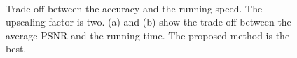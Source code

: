 \documentclass[review,numbers,sort&compress]{elsarticle}  %
\begin{document}
\begin{figure}[htbp]
\centering
         \\

\caption{Trade-off between the accuracy and the running speed. The upscaling factor is two. (a) and (b) show the trade-off between the average PSNR and the running time. The proposed method is the best.}
\label{fig:compares_1}
\end{figure}
\end{document}
